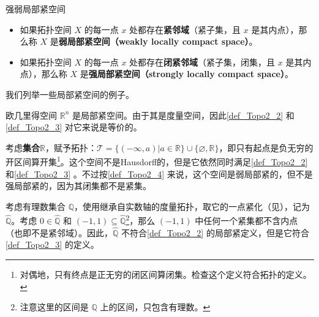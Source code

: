 \begin{definition}{强弱局部紧空间}\label{def_Topo2_4}
\begin{itemize}
\item 如果拓扑空间 $X$ 的每一点 $x$ 处都存在\textbf{紧邻域}（紧子集，且 $x$ 是其内点），那么称 $X$ 是\textbf{弱局部紧空间（weakly locally compact space）}。
\item 如果拓扑空间 $X$ 的每一点 $x$ 处都存在\textbf{闭紧邻域}（紧子集，闭集，且 $x$ 是其内点），那么称 $X$ 是\textbf{强局部紧空间（strongly locally compact space）}。
\end{itemize}
\end{definition}

我们列举一些局部紧空间的例子。

\begin{example}{}
欧几里得空间 $\mathbb{R}^n$ 是局部紧空间。由于其是度量空间，因此\autoref{def_Topo2_2} 和\autoref{def_Topo2_3} 对它来说是等价的。
\end{example}

\begin{example}{}
考虑\textbf{集合}$\mathbb{R}$，赋予拓扑：$\mathcal{T}=\{(-\infty, a)|a\in\mathbb{R}\}\cup\{\varnothing, \mathbb{R}\}$，即只有起点是负无穷的开区间算开集\footnote{对偶地，只有终点是正无穷的闭区间算闭集。检查这个定义符合拓扑的定义。}。这个空间不是Hausdorff的，但是它依然同时满足\autoref{def_Topo2_2} 和\autoref{def_Topo2_3} 。不过按\autoref{def_Topo2_4} 来说，这个空间是弱局部紧的，但不是强局部紧的，因为其闭集都不是紧集。
\end{example}

\begin{example}{}
考虑有理数集合 $\mathbb{Q}$，使用继承自实数轴的度量拓扑，取它的一点紧化（见），记为 $\hat{\mathbb{Q}}$。考虑 $0\in\hat{\mathbb{Q}}$ 和 $(-1, 1)\subseteq\hat{\mathbb{Q}}$\footnote{注意这里的区间是 $\mathbb{Q}$ 上的区间，只包含有理数。}，那么 $(-1, 1)$ 中任何一个紧集都不含内点（也即不是紧邻域）。因此，$\hat{\mathbb{Q}}$ 不符合\autoref{def_Topo2_2} 的局部紧定义，但是它符合\autoref{def_Topo2_3} 的定义。
\end{example}












